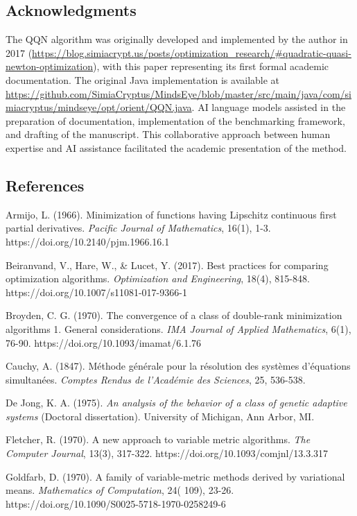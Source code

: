 \hypertarget{acknowledgments}{%
\subsection{Acknowledgments}\label{acknowledgments}}

The QQN algorithm was originally developed and implemented by the author in 2017
(\url{https://blog.simiacrypt.us/posts/optimization_research/#quadratic-quasi-newton-optimization}), with this paper representing its first formal
academic documentation. The original Java implementation is available at
\url{https://github.com/SimiaCryptus/MindsEye/blob/master/src/main/java/com/simiacryptus/mindseye/opt/orient/QQN.java}.
AI language models assisted in the preparation of documentation, implementation of the
benchmarking framework, and drafting of the manuscript. This collaborative approach between human expertise
and AI assistance facilitated the academic presentation of the method.

\hypertarget{references}{%
\subsection{References}\label{references}}

Armijo, L. (1966). Minimization of functions having Lipschitz continuous first partial derivatives. \emph{Pacific Journal of
Mathematics}, 16(1), 1-3. https://doi.org/10.2140/pjm.1966.16.1

Beiranvand, V., Hare, W., \& Lucet, Y. (2017). Best practices for comparing optimization algorithms. \emph{Optimization and
Engineering}, 18(4), 815-848. https://doi.org/10.1007/s11081-017-9366-1

Broyden, C. G. (1970). The convergence of a class of double-rank minimization algorithms 1. General considerations. \emph{IMA
Journal of Applied Mathematics}, 6(1), 76-90. https://doi.org/10.1093/imamat/6.1.76

Cauchy, A. (1847). Méthode générale pour la résolution des systèmes d'équations simultanées. \emph{Comptes Rendus de
l'Académie des Sciences}, 25, 536-538.

De Jong, K. A. (1975). \emph{An analysis of the behavior of a class of genetic adaptive systems} (Doctoral dissertation).
University of Michigan, Ann Arbor, MI.

Fletcher, R. (1970). A new approach to variable metric algorithms. \emph{The Computer Journal}, 13(3),
317-322. https://doi.org/10.1093/comjnl/13.3.317

Goldfarb, D. (1970). A family of variable-metric methods derived by variational means. \emph{Mathematics of Computation}, 24(
109), 23-26. https://doi.org/10.1090/S0025-5718-1970-0258249-6


